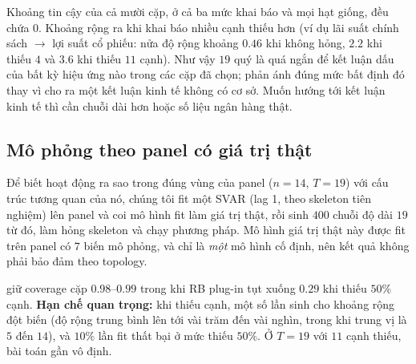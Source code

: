 Khoảng tin cậy của cả mười cặp, ở cả ba mức khai báo và mọi hạt giống, đều chứa $0$. Khoảng rộng ra khi khai báo nhiều cạnh thiếu hơn (ví dụ lãi suất chính sách $\to$ lợi suất cổ phiếu: nửa độ rộng khoảng $0.46$ khi không hỏng, $2.2$ khi thiếu $4$ và $3.6$ khi thiếu $11$ cạnh). Như vậy $19$ quý là quá ngắn để kết luận dấu của bất kỳ hiệu ứng nào trong các cặp đã chọn; \ours{} phản ánh đúng mức bất định đó thay vì cho ra một kết luận kinh tế không có cơ sở. Muốn hướng tới kết luận kinh tế thì cần chuỗi dài hơn hoặc số liệu ngân hàng thật.

\subsection{Mô phỏng theo panel có giá trị thật}
Để biết \ours{} hoạt động ra sao trong đúng vùng của panel ($n=14$, $T=19$) với cấu trúc tương quan của nó, chúng tôi fit một SVAR (lag 1, theo skeleton tiên nghiệm) lên panel và coi mô hình fit làm giá trị thật, rồi sinh $400$ chuỗi độ dài $19$ từ đó, làm hỏng skeleton và chạy phương pháp. Mô hình giá trị thật này được fit trên panel có $7$ biến mô phỏng, và chỉ là \emph{một} mô hình cố định, nên kết quả không phải bảo đảm theo topology.

\begin{table}[H]
\centering\small

\caption{Mô phỏng theo panel ($400$ lần sinh, $T=19$, $n=14$).}\label{tab:panelsim}
\end{table}

\ours{} giữ coverage cặp $0.98$--$0.99$ trong khi RB plug-in tụt xuống $0.29$ khi thiếu $50\%$ cạnh. \textbf{Hạn chế quan trọng:} khi thiếu cạnh, một số lần sinh cho khoảng rộng đột biến (độ rộng trung bình lên tới vài trăm đến vài nghìn, trong khi trung vị là $5$ đến $14$), và $10\%$ lần fit thất bại ở mức thiếu $50\%$. Ở $T=19$ với $11$ cạnh thiếu, bài toán gần vô định.
